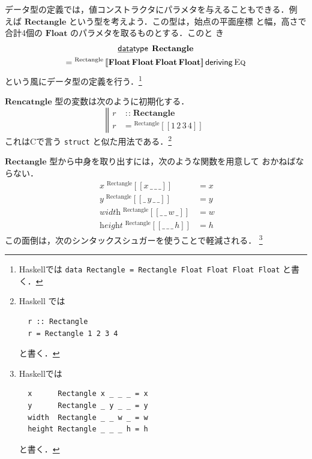 \documentclass[a5paper,twoside,fleqn,draft]{jsbook}
\def\[{\left[\!\left[}
\def\]{\right]\!\right]}
\newcommand{\programminglanguage}[1]{\textsf{#1}}
\newcommand{\clang}{\programminglanguage{C}}
\newcommand{\haskell}{\programminglanguage{Haskell}}
\newcommand{\code}[1]{\texttt{#1}}
\newcommand{\mBrace}{\Vert}
\newcommand{\mKeyword}[1]{\mathsf{#1}} %
\newcommand{\mKeywordUnderline}[1]{\text{\underline{\textsf{#1}}}} %
\newcommand{\mDataTypeKeyword}{\mKeywordUnderline{data}\mKeyword{type}}
\newcommand{\mDerivingKeyword}{\mKeyword{deriving}}
\DeclareMathOperator{\mDataType}{\mDataTypeKeyword}
\DeclareMathOperator{\mDeriving}{\mDerivingKeyword}
\newcommand{\mAnyParam}{\_}
\newcommand{\mFunc}[1]{\mathop{\mathit{#1}}}
\DeclareMathOperator{\mIn}{{:\!:}}
\newcommand{\mType}[1]{\mathbf{#1}}
\newcommand{\mFloatType}{\mType{Float}}
\newcommand{\mValueConstructor}[1]{\mathrm{#1}}
\newcommand{\mGenericValueAssemble}[2]{{}^\mValueConstructor{#1}\[#2\]}
\newcommand{\mGenericTypeClass}[1]{\textsc{#1}} %
\newcommand{\mEqTypeClass}{\mGenericTypeClass{Eq}}
\begin{document}
データ型の定義では，値コンストラクタにパラメタを与えることもできる．例
えば $\mType{Rectangle}$ という型を考えよう．この型は，始点の平面座標
と幅，高さで合計4個の $\mFloatType$ のパラメタを取るものとする．このと
き
\begin{multline}
  \label{eq:rectangle}
  \mDataType\;
  \mType{Rectangle}\\
  =\mGenericValueAssemble{Rectangle}
  {\mFloatType\,\mFloatType\,\mFloatType\,\mFloatType}
  \mDeriving\mEqTypeClass
\end{multline}
という風にデータ型の定義を行う．\footnote{\haskell では \code{data
Rectangle = Rectangle Float Float Float Float} と書く．}

$\mType{Rencatngle}$ 型の変数は次のように初期化する．
\begin{equation}
  \left\mBrace
  \begin{aligned}
    r&\mIn\mType{Rectangle}\\
    r&=\mGenericValueAssemble{Rectangle}{1\,2\,3\,4}
  \end{aligned}
  \right.
\end{equation}
これは\clang で言う \code{struct} と似た用法である．\footnote{\haskell
では
\begin{verbatim}
  r :: Rectangle
  r = Rectangle 1 2 3 4
\end{verbatim}
と書く．}

$\mType{Rectangle}$ 型から中身を取り出すには，次のような関数を用意して
おかねばならない．
\begin{align}
  \mFunc{x}\mGenericValueAssemble{Rectangle}{x\,\mAnyParam\,\mAnyParam\,\mAnyParam}
  &=x\\
  \mFunc{y}\mGenericValueAssemble{Rectangle}{\mAnyParam\,y\,\mAnyParam\,\mAnyParam}
  &=y\\
  \mFunc{width}\mGenericValueAssemble{Rectangle}{\mAnyParam\,\mAnyParam\,w\,\mAnyParam}
  &=w\\
  \mFunc{height}\mGenericValueAssemble{Rectangle}{\mAnyParam\,\mAnyParam\,\mAnyParam\,h}
  &=h
\end{align}
この面倒は，次のシンタックスシュガーを使うことで軽減される．
\footnote{\haskell では
\begin{verbatim}
  x      Rectangle x _ _ _ = x
  y      Rectangle _ y _ _ = y
  width  Rectangle _ _ w _ = w
  height Rectangle _ _ _ h = h
\end{verbatim}
と書く．}
\end{document}
